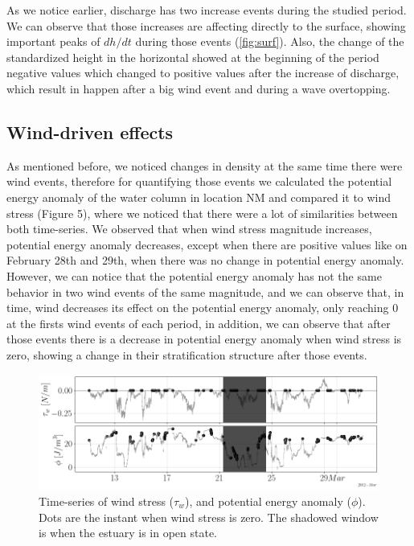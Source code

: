 \documentclass[tesis.tex]{subfiles}
\begin{document}
As we notice earlier, discharge has two increase events during the studied period. We can observe that those increases are affecting directly to the surface, showing important peaks of $dh/dt$ during those events (\ref{fig:surf}). Also, the change of the standardized height in the horizontal showed at the beginning of the period negative values which changed to positive values after the increase of discharge, which result in happen after a big wind event and during a wave overtopping.\\

\subsection{Wind-driven effects}

As mentioned before, we noticed changes in density at the same time there were wind events, therefore for quantifying those events we calculated the potential energy anomaly of the water column in location NM and compared it to wind stress (Figure 5), where we noticed that there were a lot of similarities between both time-series. We observed that when wind stress magnitude increases, potential energy anomaly decreases, except when there are positive values like on February 28th and 29th, when there was no change in potential energy anomaly. However, we can notice that the potential energy anomaly has not the same behavior in two wind events of the same magnitude, and we can observe that, in time, wind decreases its effect on the potential energy anomaly, only reaching 0 at the firsts wind events of each period, in addition, we can observe that after those events there is a decrease in potential energy anomaly when wind stress is zero, showing a change in their stratification structure after those events.

\begin{figure}[h!]
    \centering
    \includegraphics[width=\textwidth]{Imagenes/phi.png}
    \caption{Time-series of wind stress ($\tau_w$), and potential energy anomaly ($\phi$). Dots are the instant when wind stress is zero. The shadowed window is when the estuary is in open state.}
    \label{fig:phi}
\end{figure}
\end{document}

